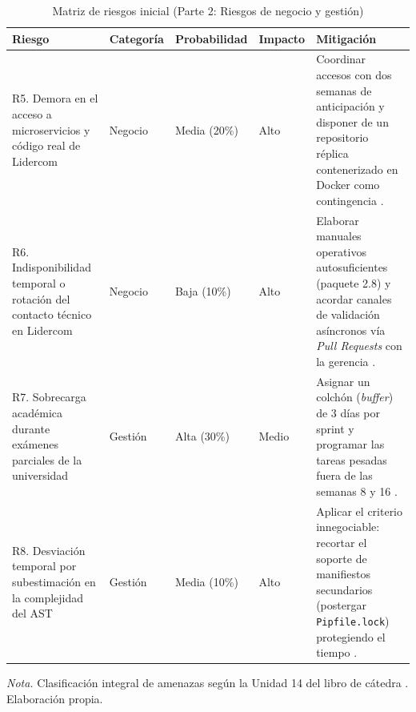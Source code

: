 \begin{table}[H]
\centering
\ContinuedFloat %
\caption{Matriz de riesgos inicial (Parte 2: Riesgos de negocio y gestión)}
\small
{}
\begin{tabularx}{\textwidth}{>{\raggedright\arraybackslash}p{4.4cm} >{\centering\arraybackslash}p{2.0cm} >{\centering\arraybackslash}p{2.3cm} >{\centering\arraybackslash}p{1.8cm} X}
\toprule
\textbf{Riesgo} & \textbf{Categoría} & \textbf{Probabilidad} & \textbf{Impacto} & \textbf{Mitigación} \\
\midrule
R5. Demora en el acceso a microservicios y código real de Lidercom & 
Negocio & 
Media (20\%) & 
Alto & 
Coordinar accesos con dos semanas de anticipación y disponer de un repositorio réplica contenerizado en Docker como contingencia \parencite{humble2010continuous}. \\
\addlinespace
R6. Indisponibilidad temporal o rotación del contacto técnico en Lidercom & 
Negocio & 
Baja (10\%) & 
Alto & 
Elaborar manuales operativos autosuficientes (paquete 2.8) y acordar canales de validación asíncronos vía \textit{Pull Requests} con la gerencia \parencite{torres2026proyecto}. \\
\addlinespace
R7. Sobrecarga académica durante exámenes parciales de la universidad & 
Gestión & 
Alta (30\%) & 
Medio & 
Asignar un colchón (\textit{buffer}) de 3 días por sprint y programar las tareas pesadas fuera de las semanas 8 y 16 \parencite{pmi2021pmbok}. \\
\addlinespace
R8. Desviación temporal por subestimación en la complejidad del AST & 
Gestión & 
Media (10\%) & 
Alto & 
Aplicar el criterio innegociable: recortar el soporte de manifiestos secundarios (postergar \texttt{Pipfile.lock}) protegiendo el tiempo \parencite{torres2026proyecto}. \\
\bottomrule
\end{tabularx}
\vspace{2pt}
\begin{flushleft}
\scriptsize \textit{Nota.} Clasificación integral de amenazas según la Unidad 14 del libro de cátedra \parencite{torres2026proyecto}. Elaboración propia.
\end{flushleft}
\end{table}

